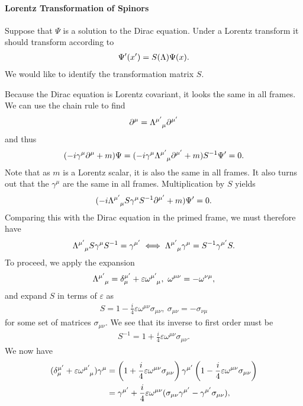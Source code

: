 \paragraph{Lorentz Transformation of Spinors}
Suppose that $\Psi$ is a solution to the Dirac equation. Under a Lorentz transform it should transform according to
\begin{align*}
	\Psi^{\prime}(x^{\prime}) = S(\Lambda)\Psi(x).
\end{align*}
We would like to identify the transformation matrix $S$.

Because the Dirac equation is Lorentz covariant, it looks the same in all frames. We can use the chain rule to find
\begin{align*}
	\del{\mu}{} = \tensor{\Lambda}{^{\mu\p}_{\mu}}\del{\mu\p}{}
\end{align*}
and thus
\begin{align*}
	(-i\gamma^{\mu}\del{\mu}{} + m)\Psi = (-i\gamma^{\mu}\tensor{\Lambda}{^{\mu\p}_{\mu}}\del{\mu\p}{} + m)S^{-1}\Psi\p = 0.
\end{align*}
Note that as $m$ is a Lorentz scalar, it is also the same in all frames. It also turns out that the $\gamma^{\mu}$ are the same in all frames. Multiplication by $S$ yields
\begin{align*}
	(-i\tensor{\Lambda}{^{\mu\p}_{\mu}}S\gamma^{\mu}S^{-1}\del{\mu\p}{} + m)\Psi\p = 0.
\end{align*}
Comparing this with the Dirac equation in the primed frame, we must therefore have
\begin{align*}
	\tensor{\Lambda}{^{\mu\p}_{\mu}}S\gamma^{\mu}S^{-1} = \gamma^{\mu\p} \iff \tensor{\Lambda}{^{\mu\p}_{\mu}}\gamma^{\mu} = S^{-1}\gamma^{\mu\p}S.
\end{align*}
To proceed, we apply the expansion
\begin{align*}
	\tensor{\Lambda}{^{\mu\p}_{\mu}} = \kdelta{\mu\p}{\mu} + \varepsilon\tensor{\omega}{^{\mu\p}_{\mu}},\ \omega^{\mu\nu} = -\omega^{\nu\mu},
\end{align*}
and expand $S$ in terms of $\varepsilon$ as
\begin{align*}
	S = 1 - \frac{i}{4}\varepsilon\omega^{\mu\nu}\sigma_{\mu\nu},\ \sigma_{\mu\nu} = -\sigma_{\nu\mu}
\end{align*}
for some set of matrices $\sigma_{\mu\nu}$. We see that its inverse to first order must be
\begin{align*}
	S^{-1} = 1 + \frac{i}{4}\varepsilon\omega^{\mu\nu}\sigma_{\mu\nu}.
\end{align*}
We now have
\begin{align*}
	(\kdelta{\mu\p}{\mu} + \varepsilon\tensor{\omega}{^{\mu\p}_{\mu}})\gamma^{\mu} &= \left(1 + \frac{i}{4}\varepsilon\omega^{\mu\nu}\sigma_{\mu\nu}\right)\gamma^{\mu\p}\left(1 - \frac{i}{4}\varepsilon\omega^{\mu\nu}\sigma_{\mu\nu}\right) \\
	&= \gamma^{\mu\p} + \frac{i}{4}\varepsilon\omega^{\mu\nu}(\sigma_{\mu\nu}\gamma^{\mu\p} - \gamma^{\mu\p}\sigma_{\mu\nu}),
\end{align*}
